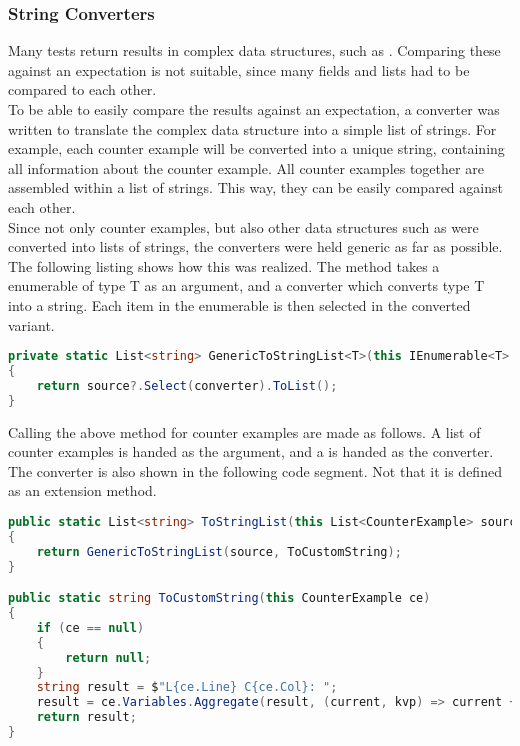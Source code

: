 {{\subsubsection{String Converters}
Many tests return results in complex data structures, such as .
Comparing these against an expectation is not suitable, since many fields and lists had to be compared to each other.\\
To be able to easily compare the results against an expectation, a converter was written to translate the complex data structure into a simple list of strings.
For example, each counter example will be converted into a unique string, containing all information about the counter example.
All counter examples together are assembled within a list of strings.
This way, they can be easily compared against each other.\\
Since not only counter examples, but also other data structures such as  were converted into lists of strings, the converters were held generic as far as possible.
The following listing shows how this was realized.
The method takes a enumerable of type T as an argument, and a converter which converts type T into a string.
Each item in the enumerable is then selected in the converted variant.

\begin{lstlisting}[language=csharp, caption={Generic Method to Convert an IEnumerable}, captionpos=b, label={lst:genericconverter}]
private static List<string> GenericToStringList<T>(this IEnumerable<T> source, Func<T, string> converter)
{
    return source?.Select(converter).ToList();
}
\end{lstlisting}

Calling the above method for counter examples are made as follows.
A list of counter examples is handed as the argument, and a  is handed as the converter.
The converter is also shown in the following code segment.
Not that it is defined as an extension method.

\begin{lstlisting}[language=csharp, caption={Converting CounterExamples to strings}, captionpos=b, label={lst:converterCEToString}]
public static List<string> ToStringList(this List<CounterExample> source)
{
    return GenericToStringList(source, ToCustomString);
}

public static string ToCustomString(this CounterExample ce)
{
    if (ce == null)
    {
        return null;
    }
    string result = $"L{ce.Line} C{ce.Col}: ";
    result = ce.Variables.Aggregate(result, (current, kvp) => current + $"{kvp.Key} = {kvp.Value}; ");
    return result;
}
\end{lstlisting}

}}
